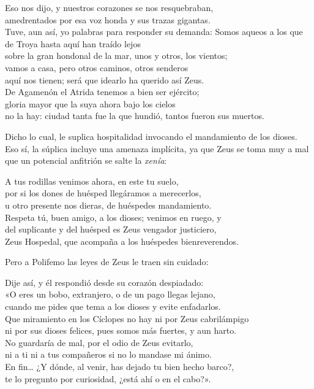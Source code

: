 \begin{versocita}
Eso nos dijo, y nuestros corazones se nos resquebraban,\\
amedrentados por esa voz honda y sus trazas gigantas.\\
Tuve, aun así, yo palabras para responder su demanda:
\stanzabreak
Somos aqueos a los que de Troya hasta aquí han traído lejos\\
sobre la gran hondonal de la mar, unos y otros, los vientos;\\
vamos a casa, pero otros caminos, otros senderos\\
aquí nos tienen; será que idearlo ha querido así Zeus.\\
De Agamenón el Atrida tenemos a bien ser ejército;\\
gloria mayor que la suya ahora bajo los cielos\\
no la hay: ciudad tanta fue la que hundió, tantos fueron sus muertos.
\end{versocita}

Dicho lo cual, le suplica hospitalidad invocando el mandamiento de los dioses. Eso sí, la súplica incluye una amenaza implícita, ya que Zeus se toma muy a mal que un potencial anfitrión se salte la \emph{xenía}:

\begin{versocita}
A tus rodillas venimos ahora, en este tu suelo,\\
por si los dones de huésped llegáramos a merecerlos,\\
u otro presente nos dieras, de huéspedes mandamiento.\\
Respeta tú, buen amigo, a los dioses; venimos en ruego, y\\
del suplicante y del huésped es Zeus vengador justiciero,\\
Zeus Hospedal, que acompaña a los huéspedes bienreverendos.
\end{versocita}

Pero a Polifemo las leyes de Zeus le traen sin cuidado:

\begin{versocita}
Dije así, y él respondió desde su corazón despiadado:\\
«O eres un bobo, extranjero, o de un pago llegas lejano,\\
cuando me pides que tema a los dioses y evite enfadarlos.\\
Que miramiento en los Cíclopes no hay ni por Zeus cabrilámpigo\\
ni por sus dioses felices, pues somos más fuertes, y aun harto.\\
No guardaría de mal, por el odio de Zeus evitarlo,\\
ni a ti ni a tus compañeros si no lo mandase mi ánimo.\\
En fin… ¿Y dónde, al venir, has dejado tu bien hecho barco?,\\
te lo pregunto por curiosidad, ¿está ahí o en el cabo?».
\end{versocita}

